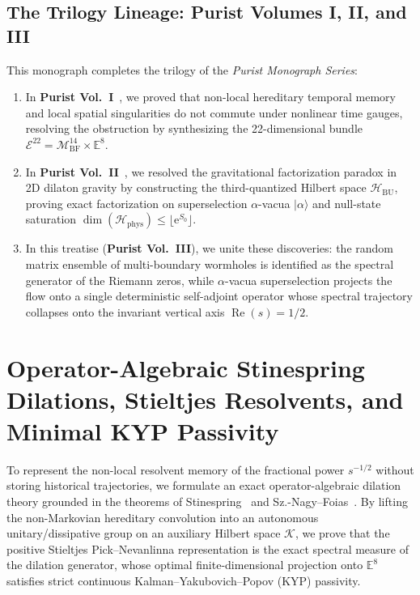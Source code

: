 \documentclass[11pt,a4paper,reqno]{article}
\theoremstyle{plain}
\theoremstyle{definition}
\theoremstyle{remark}
\numberwithin{equation}{section}
\newcommand{\Hbu}{\mathcal{H}_{\mathrm{BU}}}
\newcommand{\Hphys}{\mathcal{H}_{\mathrm{phys}}}
\begin{document}
\subsection{The Trilogy Lineage: Purist Volumes I, II, and III}
This monograph completes the trilogy of the \emph{Purist Monograph Series}:
\begin{enumerate}[label=\textbf{(\arabic*)}, leftmargin=2.0em]
  \item In \textbf{Purist Vol.~I}~\cite{PuristVol1Monograph2026}, we proved that non-local hereditary temporal memory and local spatial singularities do not commute under nonlinear time gauges, resolving the obstruction by synthesizing the 22-dimensional bundle $\mathcal{E}^{22} = \mathcal{M}_{\mathrm{BF}}^{14} \times \mathbb{E}^8$.
  \item In \textbf{Purist Vol.~II}~\cite{PuristVol2Monograph2026}, we resolved the gravitational factorization paradox in 2D dilaton gravity by constructing the third-quantized Hilbert space $\Hbu$, proving exact factorization on superselection $\alpha$-vacua $|\alpha\rangle$ and null-state saturation $\dim(\Hphys) \le \lfloor \mathrm{e}^{S_0} \rfloor$.
  \item In this treatise (\textbf{Purist Vol.~III}), we unite these discoveries: the random matrix ensemble of multi-boundary wormholes is identified as the spectral generator of the Riemann zeros, while $\alpha$-vacua superselection projects the flow onto a single deterministic self-adjoint operator whose spectral trajectory collapses onto the invariant vertical axis $\operatorname{Re}(s) = 1/2$.
\end{enumerate}

\section{Operator-Algebraic Stinespring Dilations, Stieltjes Resolvents, and Minimal KYP Passivity}
\label{sec:stinespring_kyp}

To represent the non-local resolvent memory of the fractional power $s^{-1/2}$ without storing historical trajectories, we formulate an exact operator-algebraic dilation theory grounded in the theorems of Stinespring~\cite{stinespring1955} and Sz.-Nagy--Foias~\cite{sznagy1970}. By lifting the non-Markovian hereditary convolution into an autonomous unitary/dissipative group on an auxiliary Hilbert space $\mathcal{K}$, we prove that the positive Stieltjes Pick--Nevanlinna representation is the exact spectral measure of the dilation generator, whose optimal finite-dimensional projection onto $\mathbb{E}^8$ satisfies strict continuous Kalman--Yakubovich--Popov (KYP) passivity.
\end{document}
